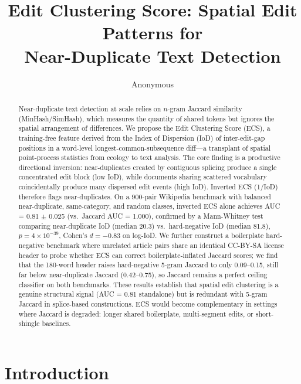 \documentclass[11pt,letterpaper]{article}
\title{\textbf{Edit Clustering Score: Spatial Edit Patterns for\\Near-Duplicate Text Detection}}
\author{Anonymous}
\date{}
\begin{document}
\maketitle

\begin{abstract}
Near-duplicate text detection at scale relies on $n$-gram Jaccard similarity (MinHash/SimHash), which measures the quantity of shared tokens but ignores the spatial arrangement of differences. We propose the Edit Clustering Score (ECS), a training-free feature derived from the Index of Dispersion (IoD) of inter-edit-gap positions in a word-level longest-common-subsequence diff---a transplant of spatial point-process statistics from ecology to text analysis. The core finding is a productive directional inversion: near-duplicates created by contiguous splicing produce a single concentrated edit block (low IoD), while documents sharing scattered vocabulary coincidentally produce many dispersed edit events (high IoD). Inverted ECS (1/IoD) therefore flags near-duplicates. On a 900-pair Wikipedia benchmark with balanced near-duplicate, same-category, and random classes, inverted ECS alone achieves AUC = 0.81 $\pm$ 0.025 (vs.\ Jaccard AUC = 1.000), confirmed by a Mann-Whitney test comparing near-duplicate IoD (median 20.3) vs.\ hard-negative IoD (median 81.8), $p = 4 \times 10^{-39}$, Cohen's $d = -0.83$ on log-IoD. We further construct a boilerplate hard-negative benchmark where unrelated article pairs share an identical CC-BY-SA license header to probe whether ECS can correct boilerplate-inflated Jaccard scores; we find that the 180-word header raises hard-negative 5-gram Jaccard to only 0.09--0.15, still far below near-duplicate Jaccard (0.42--0.75), so Jaccard remains a perfect ceiling classifier on both benchmarks. These results establish that spatial edit clustering is a genuine structural signal (AUC = 0.81 standalone) but is redundant with 5-gram Jaccard in splice-based constructions. ECS would become complementary in settings where Jaccard is degraded: longer shared boilerplate, multi-segment edits, or short-shingle baselines.
\end{abstract}

\section{Introduction}
\end{document}
